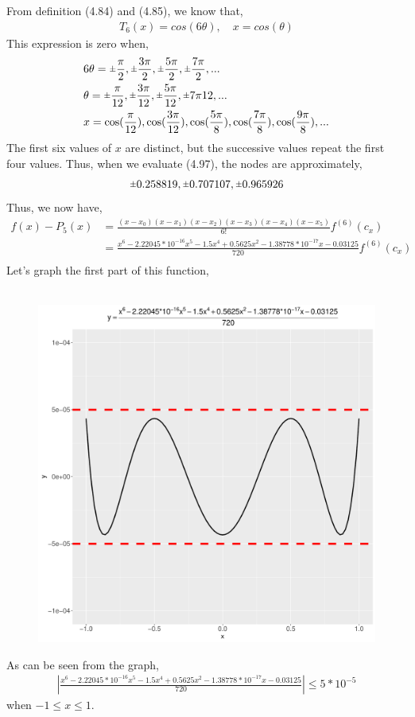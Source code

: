 \documentclass[12pt]{article}
\newcommand{\rpm}{\sbox0{$1$}\sbox2{$\scriptstyle\pm$}
  \raise\dimexpr(\ht0-\ht2)/2\relax\box2 }
\begin{document}
\begin{enumerate}
	From definition (4.84) and (4.85), we know that,
	\begin{align*}
		T_6(x) = cos(6\theta), \quad x = cos(\theta)
	\end{align*}
	This expression is zero when,
	\begin{align*}
		&6\theta = \rpm \frac{\pi}{2}, \rpm \frac{3\pi}{2}, \rpm \frac{5\pi}{2}, \rpm \frac{7\pi}{2}, ...\\
		&\theta = \rpm \frac{\pi}{12}, \rpm \frac{3\pi}{12}, \rpm \frac{5\pi}{12}, \rpm{7\pi}{12}, ...\\
		&x = \cos(\frac{\pi}{12}), \cos(\frac{3\pi}{12}), \cos(\frac{5\pi}{8}), \cos(\frac{7\pi}{8}), \cos(\frac{9\pi}{8}), ...
	\end{align*}
	The first six values of $x$ are distinct, but the successive values repeat the first four values. Thus, when we evaluate (4.97), the nodes are approximately,
	\begin{align*}
			\rpm 0.258819, \rpm 0.707107, \rpm 0.965926
	\end{align*}
	Thus, we now have,
	\begin{align*}
			f(x) - P_5(x) &= \frac{(x - x_0)(x - x_1)(x - x_2)(x - x_3)(x - x_4)(x - x_5)}{6!}f^{(6)}(c_x)\\
			&= \frac{x^6 - 2.22045*10^{-16}x^5 - 1.5x^4 + 0.5625x^2 - 1.38778*10^{-17}x - 0.03125}{720}f^{(6)}(c_x)\\
	\end{align*}
	Let's graph the first part of this function,\\\\
	\begin{figure}[H]
	\centering
	\includegraphics[scale=0.6]{graph}
	\end{figure}
	As can be seen from the graph, 
	\begin{align*}
		\left|\frac{x^6 - 2.22045*10^{-16}x^5 - 1.5x^4 + 0.5625x^2 - 1.38778*10^{-17}x - 0.03125}{720}\right| \leq 5*10^{-5}
	\end{align*}
	when $-1 \leq x \leq 1$.\\
	

\end{enumerate}
\end{document}
